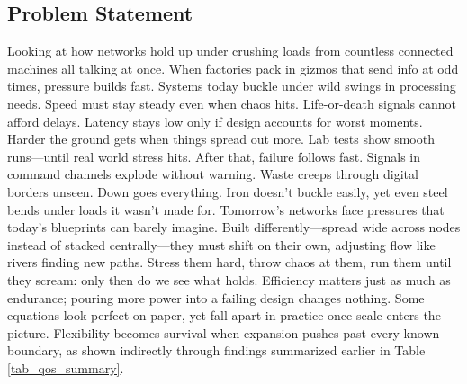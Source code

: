 \documentclass[a4paper,fleqn]{cas-dc}
\numberwithin{equation}{section}
\begin{document}
\subsection{Problem Statement}

Looking at how networks hold up under crushing loads from countless connected machines all talking at once. When factories pack in gizmos that send info at odd times, pressure builds fast. Systems today buckle under wild swings in processing needs. Speed must stay steady even when chaos hits. Life-or-death signals cannot afford delays. Latency stays low only if design accounts for worst moments. Harder the ground gets when things spread out more. Lab tests show smooth runs—until real world stress hits. After that, failure follows fast. Signals in command channels explode without warning. Waste creeps through digital borders unseen. Down goes everything. Iron doesn't buckle easily, yet even steel bends under loads it wasn't made for. Tomorrow's networks face pressures that today's blueprints can barely imagine. Built differently—spread wide across nodes instead of stacked centrally—they must shift on their own, adjusting flow like rivers finding new paths. Stress them hard, throw chaos at them, run them until they scream: only then do we see what holds. Efficiency matters just as much as endurance; pouring more power into a failing design changes nothing. Some equations look perfect on paper, yet fall apart in practice once scale enters the picture. Flexibility becomes survival when expansion pushes past every known boundary, as shown indirectly through findings summarized earlier in Table \ref{tab_qos_summary}.
\end{document}
